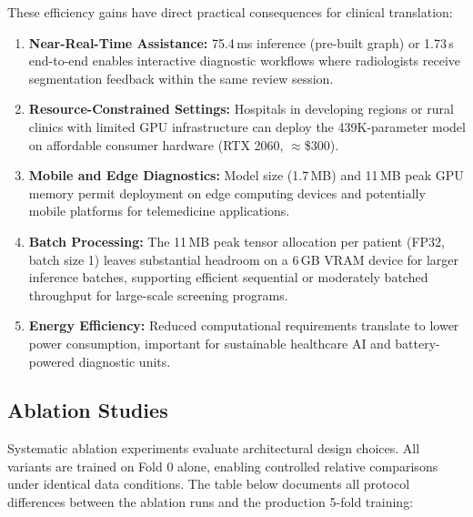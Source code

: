 \documentclass{article}
\begin{document}
These efficiency gains have direct practical consequences for clinical translation:

\begin{enumerate}
    \item \textbf{Near-Real-Time Assistance:} 75.4\,ms inference (pre-built graph) or 1.73\,s end-to-end enables interactive diagnostic workflows where radiologists receive segmentation feedback within the same review session.

    \item \textbf{Resource-Constrained Settings:} Hospitals in developing regions or rural clinics with limited GPU infrastructure can deploy the 439K-parameter model on affordable consumer hardware (RTX 2060, $\approx$\$300).

    \item \textbf{Mobile and Edge Diagnostics:} Model size (1.7\,MB) and 11\,MB peak GPU memory permit deployment on edge computing devices and potentially mobile platforms for telemedicine applications.

    \item \textbf{Batch Processing:} The 11\,MB peak tensor allocation per patient (FP32, batch size 1) leaves substantial headroom on a 6\,GB VRAM device for larger inference batches, supporting efficient sequential or moderately batched throughput for large-scale screening programs.

    \item \textbf{Energy Efficiency:} Reduced computational requirements translate to lower power consumption, important for sustainable healthcare AI and battery-powered diagnostic units.
\end{enumerate}


\subsection{Ablation Studies}

Systematic ablation experiments evaluate architectural design choices. All variants are trained on Fold 0 alone, enabling controlled relative comparisons under identical data conditions. The table below documents all protocol differences between the ablation runs and the production 5-fold training:
\end{document}
